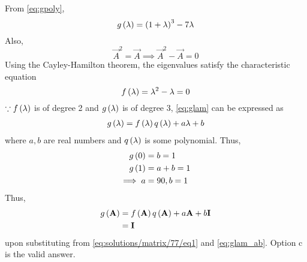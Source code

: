 
		From \eqref{eq:gpoly}, 
\begin{equation}
\label{eq:glam}
g\left(\lambda\right) = \left(1+\lambda\right)^{3}-7\lambda
\end{equation}
%
Also, 
\begin{equation}
 \vec{A}^2 = \vec{A} \implies \vec{A}^2 - \vec{A} = 0 
\end{equation}
Using the Cayley-Hamilton theorem, the eigenvalues satisfy the characteristic equation 
%
\begin{equation}\label{eq:solutions/matrix/77/eq1}
f\left(\lambda\right) = \lambda^2 - \lambda = 0 
\end{equation}
$\because  f\left(\lambda\right)$  is of degree 2 and $g\left(\lambda\right) $ is of degree 3, \eqref{eq:glam} can be expressed as
\begin{align}
	g\left(\lambda\right)	 = f\left(\lambda\right)		q\left(\lambda\right)	+ a\lambda +b
\end{align}
%
where $a, b$ are real numbers and $q\left(\lambda\right)$ is some polynomial.  Thus, 
\begin{align}
	g\left(0\right)	 &= b = 1
	\\
	g\left(1\right)	 &= a+b = 1
	\\
	\implies a &= 90, b = 1
	\label{eq:glam_ab}
\end{align}
Thus, 
\begin{align}
	g\left(\mathbf{A}\right) &= f\left(\mathbf{A}\right)		q\left(\mathbf{A}\right)	+ a\mathbf{A} +b\mathbf{I}
	\\
	&= \mathbf{I}
\end{align}
upon substituting from \eqref{eq:solutions/matrix/77/eq1} and \eqref{eq:glam_ab}.
Option c is the valid answer.

